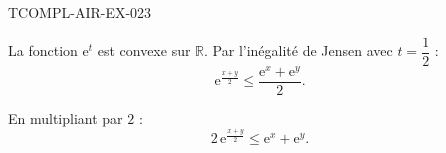 \begin{corrige}{TCOMPL-AIR-EX-023}

La fonction $\mathrm{e}^t$ est convexe sur $\mathbb{R}$. Par l'inégalité de Jensen avec $t = \dfrac{1}{2}$ :
\[ \mathrm{e}^{\frac{x+y}{2}} \leq \frac{\mathrm{e}^x + \mathrm{e}^y}{2}. \]


En multipliant par $2$ :
\[ 2\,\mathrm{e}^{\frac{x+y}{2}} \leq \mathrm{e}^x + \mathrm{e}^y. \]

\end{corrige}
